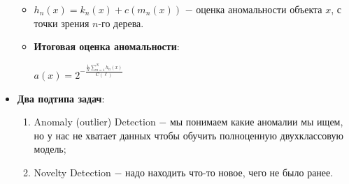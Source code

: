 \begin{itemize}
\begin{itemize}
                        \item $h_n(x) = k_n(x) + c(m_n(x))$ $-$ оценка аномальности объекта $x$, с точки зрения $n$-го дерева.

                        \item \colorbox{orange!20}{\textbf{Итоговая оценка аномальности}}:
                        \begin{center}
                            \Large
                            $a(x) = 2^{-\frac{\frac{1}{N} \sum \limits_{n = 1}^N h_n(x)} {C(\ell)}}$
                        \end{center}
                    \end{itemize}
                     

                \item \colorbox{blue!20}{\textbf{Два подтипа задач}}:

                \begin{enumerate}
                    \item Anomaly (outlier) Detection $-$ мы понимаем какие аномалии мы ищем, но у нас не хватает данных чтобы обучить полноценную  двухклассовую модель;

                    \item Novelty Detection $-$ надо находить что-то новое, чего не было ранее.  
                \end{enumerate}
            \end{itemize}
        

